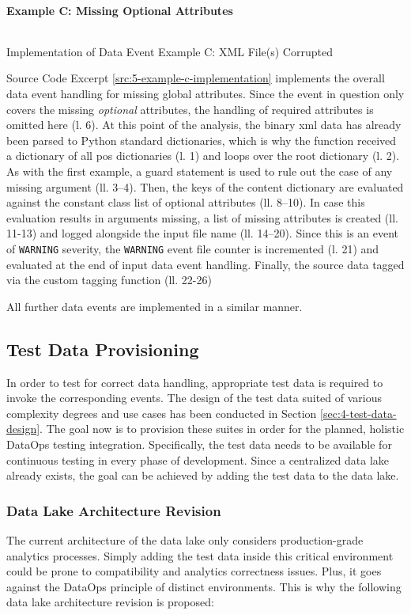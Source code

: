 \paragraph{Example C: Missing Optional Attributes}
\begin{listing}[h!]
	\inputminted{python}{main-matter/src/5-c.py}
	\caption{Implementation of Data Event Example C: XML File(s) Corrupted}
	\label{src:5-example-c-implementation}
\end{listing}
Source Code Excerpt \ref{src:5-example-c-implementation} implements the overall data event handling for missing global attributes. Since the event in question only covers the missing \textit{optional} attributes, the handling of required attributes is omitted here (l. 6). At this point of the analysis, the binary \ac{xml} data has already been parsed to Python standard dictionaries, which is why the function received a dictionary of all \ac{pos} dictionaries (l. 1) and loops over the root dictionary (l. 2). As with the first example, a guard statement is used to rule out the case of any missing argument (ll. 3--4). Then, the keys of the content dictionary are evaluated against the constant class list of optional attributes (ll. 8--10). In case this evaluation results in arguments missing, a list of missing attributes is created (ll. 11-13) and logged alongside the input file name (ll. 14--20). Since this is an event of \texttt{WARNING} severity, the \texttt{WARNING} event file counter is incremented (l. 21) and evaluated at the end of input data event handling. Finally, the source data tagged via the custom tagging function (ll. 22-26)

All further data events are implemented in a similar manner.

\subsection{Test Data Provisioning}
In order to test for correct data handling, appropriate test data is required to invoke the corresponding events. The design of the test data suited of various complexity degrees and use cases has been conducted in Section \ref{sec:4-test-data-design}. The goal now is to provision these suites in order for the planned, holistic DataOps testing integration. Specifically, the test data needs to be available for continuous testing in every phase of development. Since a centralized data lake already exists, the goal can be achieved by adding the test data to the data lake.

\subsubsection{Data Lake Architecture Revision}
The current architecture of the data lake only considers production-grade analytics processes. Simply adding the test data inside this critical environment could be prone to compatibility and analytics correctness issues. Plus, it goes against the DataOps principle of distinct environments. This is why the following data lake architecture revision is proposed:

